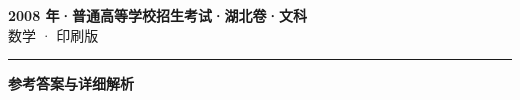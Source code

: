 \documentclass[zihao=5, a4paper]{ctexart}
\begin{document}
\begin{center}
  {\Large\bfseries 2008 年·普通高等学校招生考试·湖北卷·文科}\\[4pt]
  {\large 数学 · 印刷版}
\end{center}
\medskip
{}

\par\bigskip\hrule\bigskip
{}
\begin{center}{\large\bfseries 参考答案与详细解析}\end{center}
\smallskip

\end{document}
